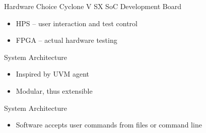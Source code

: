 \documentclass[t]{beamer}
\begin{document}
\begin{frame}{Hardware Choice}
  Cyclone V SX SoC Development Board
  \begin{figure}[H]
    \centering
  \end{figure}
  \begin{itemize}
    \item HPS -- user interaction and test control
    \item FPGA -- actual hardware testing
  \end{itemize}
\end{frame}

\begin{frame}{System Architecture}
  \begin{itemize}
    \item Inspired by UVM agent
    \item Modular, thus extensible
  \end{itemize}
  \begin{figure}[H]
    \centering
    \resizebox{0.8\textwidth}{!}{%
      
    }
  \end{figure}
\end{frame}

\begin{frame}{System Architecture}
  \begin{figure}[H]
    \centering
    \resizebox{0.8\textwidth}{!}{%
      
    }
  \end{figure}
  \begin{itemize}
    \item Software accepts user commands from files or command line
  \end{itemize}
\end{frame}
\end{document}
